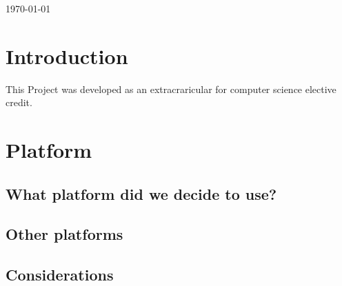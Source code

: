 \documentclass[letterpaper,10pt,notitlepage,fleqn]{article}
\begin{document}
\begin{titlepage}


{\large \today}\\[3cm] %




\vfill %



\end{titlepage}

\tableofcontents
\newpage

\section{Introduction}
\indent This Project was developed as an extracraricular for computer science elective credit. 


\section{Platform}

\subsection{What platform did we decide to use?}
\indent 
\subsection{Other platforms}
\indent 
\subsection{Considerations}
\indent
\end{document}
